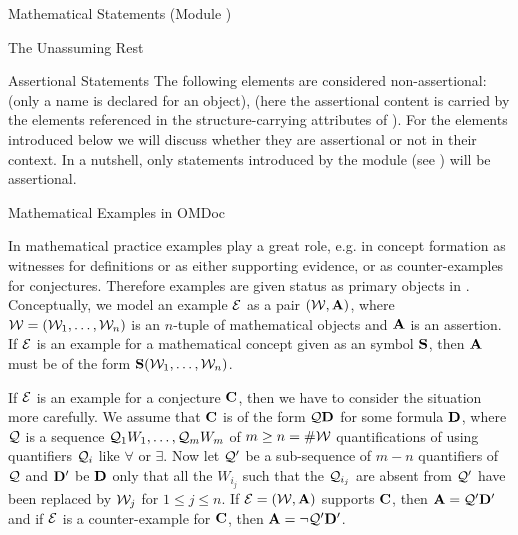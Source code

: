 \begin{tchapter}[id=statements,short=Mathematical Statements]{Mathematical Statements (Module {})}
\begin{tsection}[id=assertion]{The Unassuming Rest}
\begin{tsubsection}[id=assertional-statements,short=Assertional Statements]{Assertional Statements}
  The following elements are considered non-assertional: {} (only a name
  is declared for an object), {} (here the assertional content is
  carried by the {} elements referenced in the structure-carrying
  attributes of {}).  For the elements introduced below we will
  discuss whether they are assertional or not in their context. In a nutshell, only
  statements introduced by the module {} (see {}) will be
  assertional.
\end{tsubsection}           
\end{tsection}

\begin{tsection}[id=examples]{Mathematical Examples in OMDoc}

  In mathematical practice examples play a great role, e.g. in concept formation as
  witnesses for definitions or as either supporting evidence, or as counter-examples for
  conjectures.  Therefore examples are given status as primary objects in {\omdoc}.
  Conceptually, we model an example ${\cal E}$ as a pair $({\cal W},{\bf A})$, where
  ${\cal W}=({\cal W}_1,\ldots,{\cal W}_n)$ is an $n$-tuple of mathematical objects and ${\bf A}$ is an
  assertion. If ${\cal E}$ is an example for a mathematical concept given as an {\omdoc} symbol
  ${\bf S}$, then ${\bf A}$ must be of the form ${\bf S}({\cal W}_1,\ldots,{\cal W}_n)$. 
  
  If ${\cal E}$ is an example for a conjecture ${\bf C}$, then we have to consider the situation
  more carefully. We assume that ${\bf C}$ is of the form
  ${\cal Q}{\bf D}$ for some formula ${\bf D}$, where ${\cal Q}$ is a sequence ${\cal Q}_1W_1,\ldots,{\cal Q}_mW_m$ of
  $m\geq n=\#{\cal W}$ quantifications of using quantifiers ${\cal Q}_i$ like $\forall$ or
  $\exists$.  Now let ${\cal Q}'$ be a sub-sequence of $m-n$ quantifiers of ${\cal Q}$ and ${\bf D}'$ be
  ${\bf D}$ only that all the $W_{i_j}$ such that the ${\cal Q}_{i_j}$ are absent from ${\cal Q}'$ have
  been replaced by ${\cal W}_j$ for $1\leq j\leq n$.  If ${\cal E}=({\cal W},{\bf A})$ supports ${\bf C}$, then
  ${\bf A}={\cal Q}'{\bf D}'$ and if ${\cal E}$ is a counter-example for ${\bf C}$, then ${\bf A}=\neg{\cal Q}'{\bf D}'$.
  

\end{tsection}
\end{tchapter}
